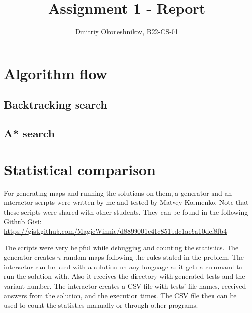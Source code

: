 \documentclass{article}
\title{Assignment 1 - Report}
\author{Dmitriy Okoneshnikov, B22-CS-01}
\begin{document}
\maketitle

\tableofcontents
\newpage

\section{Algorithm flow}
\subsection{Backtracking search}

\subsection{A* search}

\section{Statistical comparison}
For generating maps and running the solutions on them, a generator and an interactor scripts were written by me and tested by Matvey Korinenko. Note that these scripts were shared with other students. They can be found in the following Github Gist: \url{https://gist.github.com/MagicWinnie/d8899001c41c851bdc1ae9a10def8fb4}

The scripts were very helpful while debugging and counting the statistics.
The generator creates $n$ random maps following the rules stated in the problem.
The interactor can be used with a solution on any language as it gets a command to run the solution with. Also it receives the directory with generated tests and the variant number. The interactor creates a CSV file with tests' file names, received answers from the solution, and the execution times.
The CSV file then can be used to count the statistics manually or through other programs.
\end{document}
